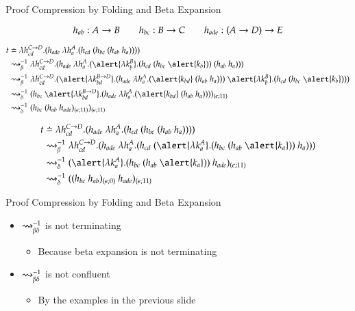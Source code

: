 \documentclass[9pt]{beamer}
\newcommand{\mypause}{\pause}
\begin{document}
\begin{frame}{Proof Compression by Folding and Beta Expansion}

$$
h_{ab}: A \rightarrow B \qquad h_{bc} : B \rightarrow C \qquad h_{ade} : (A \rightarrow D) \rightarrow E
$$

\medskip
\medskip

\begin{align*}
t & \defEq \lambda h_{cd}^{C \imp D}. (h_{ade} \ \lambda h_a^A.(h_{cd} \ (h_{bc} \ (h_{ab} \ h_a)))) \\
& \br^{-1}  \lambda h_{cd}^{C \imp D}. (h_{ade} \ \lambda h_a^A.(\alert{\lambda k_b^B}. (h_{cd} \ (h_{bc} \ \alert{k_b}))  \ (h_{ab} \ h_a))) \\
& \br^{-1}  \lambda h_{cd}^{C \imp D}. (\alert{\lambda k_{bd}^{B \imp D}}. (h_{ade}  \ \lambda h_a^A.(\alert{k_{bd}}  \ (h_{ab} \ h_a))) \ \alert{\lambda k_b^B}. (h_{cd} \ (h_{bc} \ \alert{k_b}))) \\
& \unfold^{-1}  (h_{bc} \ \alert{\lambda k_{bd}^{B \imp D}}. (h_{ade}  \ \lambda h_a^A.(\alert{k_{bd}}  \ (h_{ab} \ h_a))))_{(\eS ; 11)} \\
& \unfold^{-1}  (h_{bc} \ (h_{ab} \ h_{ade})_{(\eS ; 11)})_{(\eS ; 11)} 
\end{align*}

\mypause

\begin{align*}
t & \defEq \lambda h_{cd}^{C \imp D}. (h_{ade} \ \lambda h_a^A.(h_{cd} \ (h_{bc} \ (h_{ab} \ h_a)))) \\
& \br^{-1} \lambda h_{cd}^{C \imp D}. (h_{ade} \ \lambda h_a^A.(h_{cd} \ (\alert{\lambda k_a^A}. (h_{bc} \ (h_{ab} \ \alert{k_a})) \ h_a))) \\
& \unfold^{-1}  (\alert{\lambda k_a^A}.(h_{bc} \ (h_{ab} \ \alert{k_a})) \ h_{ade})_{(\eS ; 11)} \\
& \unfold^{-1}  ((h_{bc} \ h_{ab})_{(\eS ; 0)} \ h_{ade})_{(\eS ; 11)} 
\end{align*}
\end{frame}


\begin{frame}{Proof Compression by Folding and Beta Expansion}
\begin{itemize}
\item $\rightsquigarrow_{\beta\delta}^{-1}$ is not terminating
\begin{itemize}
	\item Because beta expansion is not terminating
\end{itemize}
\mypause
\item $\rightsquigarrow_{\beta\delta}^{-1}$ is not confluent
\begin{itemize}
	\item By the examples in the previous slide
\end{itemize}
\end{itemize}
\end{frame}
\end{document}
